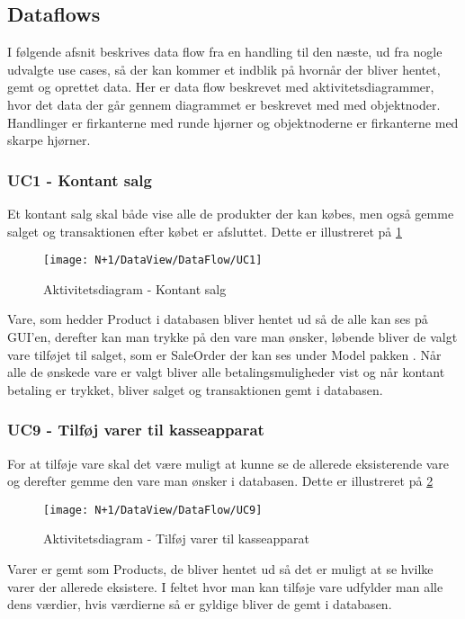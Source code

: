 \subsection{Dataflows}
I følgende afsnit beskrives data flow fra en handling til den næste, ud fra nogle udvalgte use cases, så der kan kommer et indblik på hvornår der bliver hentet, gemt og oprettet data. Her er data flow beskrevet med aktivitetsdiagrammer, hvor det data der går gennem diagrammet er beskrevet med med objektnoder. Handlinger er firkanterne med runde hjørner og objektnoderne er firkanterne med skarpe hjørner.   

\subsubsection{UC1 - Kontant salg}
Et kontant salg skal både vise alle de produkter der kan købes, men også gemme salget og transaktionen efter købet er afsluttet. Dette er illustreret på \ref{fig:AD_UC1}

\begin{figure}[H]
    \centering
    \texttt{[image: N+1/DataView/DataFlow/UC1]}
    \caption{Aktivitetsdiagram - Kontant salg}
    \label{fig:AD_UC1}
\end{figure}    

Vare, som hedder Product i databasen bliver hentet ud så de alle kan ses på GUI'en, derefter kan man trykke på den vare man ønsker, løbende bliver de valgt vare tilføjet til salget, som er SaleOrder der kan ses under Model pakken . Når alle de ønskede vare er valgt bliver alle betalingsmuligheder vist og når kontant betaling er trykket, bliver salget og transaktionen gemt i databasen. 

\subsubsection{UC9 - Tilføj varer til kasseapparat}
For at tilføje vare skal det være muligt at kunne se de allerede eksisterende vare og derefter gemme den vare man ønsker i databasen. Dette er illustreret på \ref{fig:AD_UC9}

\begin{figure}[H]
    \centering
    \texttt{[image: N+1/DataView/DataFlow/UC9]}
    \caption{Aktivitetsdiagram - Tilføj varer til kasseapparat}
    \label{fig:AD_UC9}
\end{figure}    

Varer er gemt som Products, de bliver hentet ud så det er muligt at se hvilke varer der allerede eksistere. I feltet hvor man kan tilføje vare udfylder man alle dens værdier, hvis værdierne så er gyldige bliver de gemt i databasen. 


